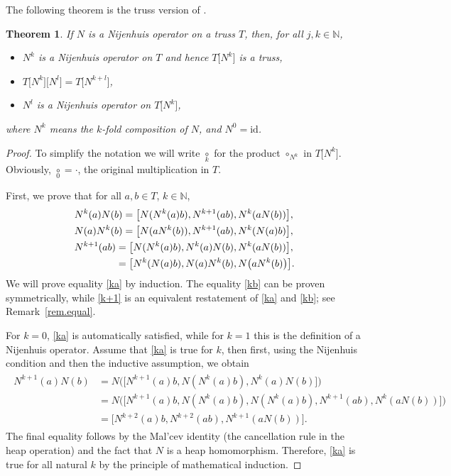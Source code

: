 \documentclass[pdftex]{sigma}
\numberwithin{equation}{section}
\newtheorem{Theorem}{Theorem}[section]
\newcommand{\N}{\mathbb N}
\newcommand{\id}{\mathrm{id}}
\def\nij#1{{\underset{#1}{\circ}}}
\begin{document}
The following theorem is the truss version of \cite[Theorem~2]{4}.
\begin{Theorem}\label{thm.Nij.iter}
If $N$ is a Nijenhuis operator on a truss $T$, then, for all $j,k\in \N$,
\begin{itemize}\itemsep=0pt
\item[$(a)$] $N^k$ is a Nijenhuis operator on $T$ and hence $T\big[N^k\big]$ is a truss,
\item[$(b)$] $T\big[N^k\big]\big[N^l\big] = T\big[N^{k+l}\big]$,
\item[$(c)$] $N^l$ is a Nijenhuis operator on $T\big[N^k\big]$,
\end{itemize}
where $N^k$ means the $k$-fold composition of $N$, and $N^0=\id$.
\end{Theorem}
\begin{proof}
To simplify the notation we will write $\nij k$ for the product $\circ_{N^k}$ in $T\big[N^k\big]$. Obviously, $\nij 0 =\cdot$, the original multiplication in $T$.

First, we prove that for all $a,b\in T$, $k\in \N$,
\begin{subequations}\label{k-power}
\begin{align}
&N^k(a)N(b) = \big[N(N^k(a)b),N^{k+1}(ab),N^k(aN(b))\big],\label{ka}\\
&N(a)N^k(b) = \big[N(aN^k(b)),N^{k+1}(ab),N^k(N(a)b)\big],\label{kb}\\
&N^{k+1}(ab) = \big[N(N^k(a)b),N^k(a)N(b),N^k(aN(b))\big],\nonumber\\
&\hphantom{N^{k+1}(ab)}{} = \big[N^k(N(a)b),N(a)N^k(b) ,N\big(aN^k(b)\big)\big].\label{k+1}
\end{align}
\end{subequations}
We will prove equality \eqref{ka} by induction. The equality \eqref{kb} can be proven symmetrically, while \eqref{k+1} is an equivalent restatement of \eqref{ka} and \eqref{kb}; see Remark~\ref{rem.equal}.

For $k=0$, \eqref{ka} is automatically satisfied, while for $k=1$ this is the definition of a Nijenhuis operator. Assume that \eqref{ka} is true for $k$, then first, using the Nijenhuis condition and then the inductive assumption, we obtain
\begin{align*}
\begin{split}
 N^{k+1}(a)N(b) &= N\big(\big[N^{k+1}(a)b, N(N^k(a)b), N^k(a)N(b)\big]\big)\\
 &= N\big(\big[N^{k+1}(a)b, N(N^k(a)b), N(N^k(a)b),N^{k+1}(ab),N^k(aN(b))\big]\big)\\
 &= \big[N^{k+2}(a)b,N^{k+2}(ab),N^{k+1}(aN(b))\big].
\end{split}
\end{align*}
The final equality follows by the Mal'cev identity (the cancellation rule in the heap operation) and the fact that $N$ is a heap homomorphism. Therefore, \eqref{ka} is true for all natural $k$ by the principle of mathematical induction.


\end{proof}
\end{document}
